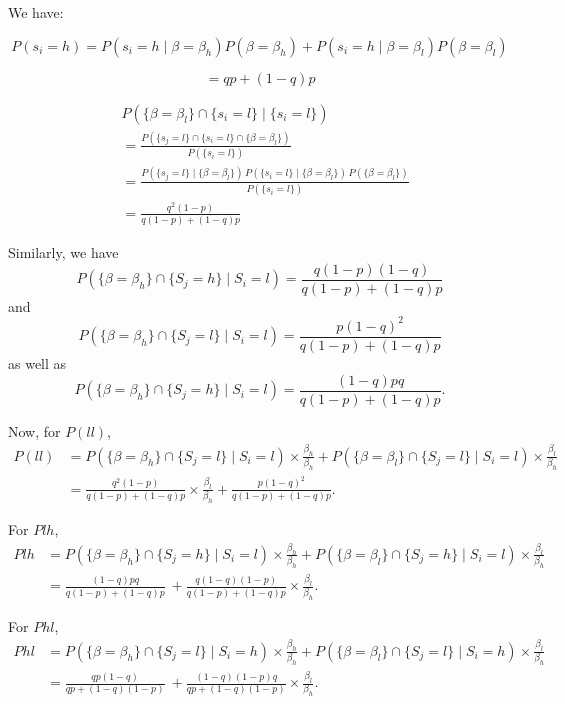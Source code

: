 \documentclass[12pt]{article}
\begin{document}
We have:

\[
P(s_i = h) = P(s_i = h \mid \beta = \beta_h)P(\beta = \beta_h) + P(s_i = h \mid \beta = \beta_l) P(\beta = \beta_l)
\]


\[
= qp+(1-q)p
\]



\begin{align*}
&P(\{ \beta = \beta_l\} \cap \{ s_i= l \} \mid \{ s_i = l \}) \\
&= \frac{P(\{ s_j = l \} \cap \{ s_i = l \} \cap \{ \beta = \beta_l \})}{P(\{ s_i = l \})} \\
&= \frac{P(\{ s_j = l \} \mid \{ \beta = \beta_l \}) \, P(\{ s_i = l \} \mid \{ \beta = \beta_l \}) \, P(\{ \beta = \beta_l\})}{P(\{ s_i = l \})} \\
&= \frac{q^2(1-p)}{q(1-p)+ (1 - q)p}
\end{align*}

Similarly, we have
\[
P(\{\beta = \beta_h\} \cap \{S_j = h\} \mid S_i = l) = \frac{q(1-p)(1-q)}{q(1-p) + (1-q)p}
\]
and
\[
P(\{\beta = \beta_h\} \cap \{S_j = l\} \mid S_i = l) = \frac{p(1-q)^2}{q(1-p) + (1-q)p}
\]
as well as
\[
P(\{\beta = \beta_h\} \cap \{S_j = h\} \mid S_i = l) = \frac{(1-q)pq}{q(1-p) + (1-q)p}.
\]

Now, for \( P(ll) \),
\begin{align*}
P(ll) &= P\left( \{\beta = \beta_h\} \cap \{S_j = l\} \mid S_i = l \right) \times \frac{\beta_h}{\beta_h}
+ P\left( \{\beta = \beta_l\} \cap \{S_j = l\} \mid S_i = l \right) \times \frac{\beta_l}{\beta_h} \\
&= \frac{q^2(1-p)} {q(1-p)+(1-q)p}\times \frac{\beta_l}{\beta_h}
+ \frac{p(1-q)^2}{q(1-p)+(1-q)p}.
\end{align*}

For \( Plh \),
\begin{align*}
Plh &= P\left( \{\beta = \beta_h\} \cap \{S_j = h\} \mid S_i = l \right) \times \frac{\beta_h}{\beta_h}
+ P\left( \{\beta = \beta_l\} \cap \{S_j = h\} \mid S_i = l \right) \times \frac{\beta_l}{\beta_h}\\
&= \frac{(1-q)pq}{q(1-p) + (1-q)p}\
+ \frac{q(1-q)(1-p)}{q(1-p) + (1-q)p} \times \frac{\beta_l}{\beta_h}.
\end{align*}

For \( Phl \),
\begin{align*}
Phl &= P\left( \{\beta = \beta_h\} \cap \{S_j = l\} \mid S_i = h \right) \times \frac{\beta_h}{\beta_h}
+ P\left( \{\beta = \beta_l\} \cap \{S_j = l\} \mid S_i = h \right) \times \frac{\beta_l}{\beta_h} \\
&= \frac{qp(1-q)}{qp + (1-q)(1-p)} \
+ \frac{(1-q)(1-p)q}{qp + (1-q)(1-p)} \times \frac{\beta_l}{\beta_h}.
\end{align*}
\end{document}
